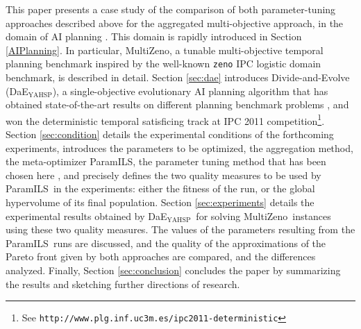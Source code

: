 \documentclass{llncs}
\newcommand{\DAEYAHSP}{{\sc DaE$_{\text{YAHSP}}$}}
\def\MULTIZENO{{\sc MultiZeno}}
\def\PARAMILS{{\sc ParamILS}}
\begin{document}
This paper presents a case study of the comparison of both parameter-tuning approaches described above for the aggregated multi-objective approach, in the domain of AI planning \cite{AIplanningBook2004}. This domain is rapidly introduced in Section \ref{AIPlanning}. In particular, \MULTIZENO, a tunable multi-objective temporal planning benchmark inspired by the well-known {\tt zeno} IPC logistic domain benchmark, is described in detail.
Section \ref{sec:dae} introduces Divide-and-Evolve (\DAEYAHSP), a single-objective evolutionary AI planning algorithm that has obtained state-of-the-art results on different planning benchmark problems \cite{Bibai2010}, and won the deterministic temporal satisficing track at IPC 2011 competition\footnote{See {\tt http://www.plg.inf.uc3m.es/ipc2011-deterministic}}. Section \ref{sec:condition} details the experimental conditions of the forthcoming experiments, introduces the parameters to be optimized, the aggregation method, the meta-optimizer \PARAMILS, the parameter tuning method that has been chosen here \cite{hutter2009paramils}, and precisely defines the two quality measures to be used by \PARAMILS\ in the experiments: either the fitness of the run, or the global hypervolume of its final population. 
Section \ref{sec:experiments} details the experimental results obtained by \DAEYAHSP\ for solving \MULTIZENO\ instances using these two quality measures. The values of the parameters resulting from the \PARAMILS\ runs are discussed, and the quality of the approximations of the Pareto front given by both approaches are compared, and the differences analyzed. Finally, Section \ref{sec:conclusion} concludes the paper by summarizing the results and sketching further directions of research.
\end{document}
